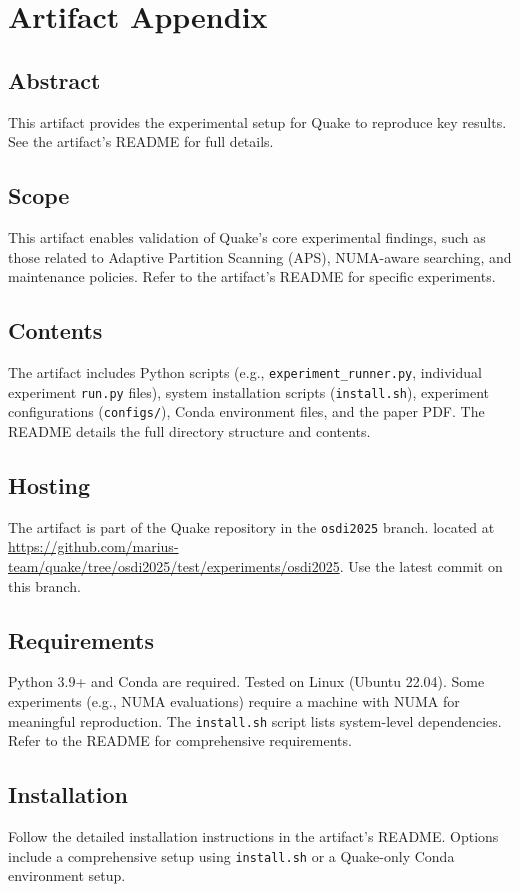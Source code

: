 \appendix
\section{Artifact Appendix}

\subsection*{Abstract}
This artifact provides the experimental setup for Quake to reproduce key results. See the artifact's README for full details.

\subsection*{Scope}
This artifact enables validation of Quake's core experimental findings, such as those related to Adaptive Partition Scanning (APS), NUMA-aware searching, and maintenance policies. Refer to the artifact's README for specific experiments.

\subsection*{Contents}
The artifact includes Python scripts (e.g., \texttt{experiment\_runner.py}, individual experiment \texttt{run.py} files), system installation scripts (\texttt{install.sh}), experiment configurations (\texttt{configs/}), Conda environment files, and the paper PDF. The README details the full directory structure and contents.

\subsection*{Hosting}
The artifact is part of the Quake repository in the \texttt{osdi2025} branch. located at \url{https://github.com/marius-team/quake/tree/osdi2025/test/experiments/osdi2025}. Use the latest commit on this branch.

\subsection*{Requirements}
Python 3.9+ and Conda are required. Tested on Linux (Ubuntu 22.04). Some experiments (e.g., NUMA evaluations) require a machine with NUMA for meaningful reproduction. The \texttt{install.sh} script lists system-level dependencies. Refer to the README for comprehensive requirements.

\subsection{Installation}
Follow the detailed installation instructions in the artifact's README. Options include a comprehensive setup using \texttt{install.sh} or a Quake-only Conda environment setup.

